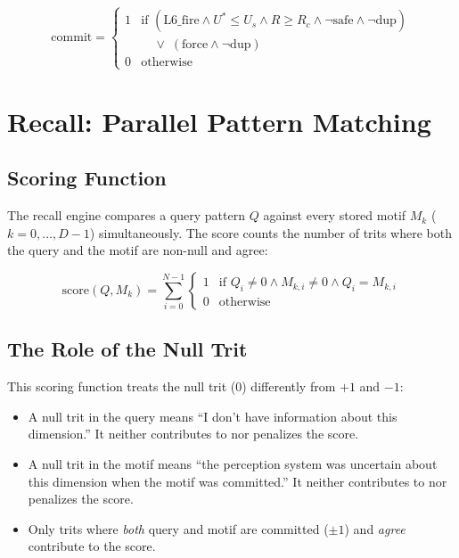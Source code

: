 \documentclass[11pt, a4paper]{article}
\begin{document}
\begin{equation}
  \text{commit} =
  \begin{cases}
    1 & \text{if } (\text{L6\_fire} \wedge U^* \leq U_s
        \wedge R \geq R_c \wedge \neg\text{safe}
        \wedge \neg\text{dup}) \\
      & \quad \vee\; (\text{force} \wedge \neg\text{dup}) \\
    0 & \text{otherwise}
  \end{cases}
\end{equation}

\section{Recall: Parallel Pattern Matching}

\subsection{Scoring Function}

The recall engine compares a query pattern $Q$ against every
stored motif $M_k$ ($k = 0, \ldots, D-1$) simultaneously.
The score counts the number of trits where both the query
and the motif are non-null and agree:

\begin{equation}
  \text{score}(Q, M_k) = \sum_{i=0}^{N-1}
  \begin{cases}
    1 & \text{if } Q_i \neq 0 \wedge M_{k,i} \neq 0
        \wedge Q_i = M_{k,i} \\
    0 & \text{otherwise}
  \end{cases}
\end{equation}

\subsection{The Role of the Null Trit}

This scoring function treats the null trit ($0$) differently
from $+1$ and $-1$:

\begin{itemize}[nosep]
  \item A null trit in the query means ``I don't have information
        about this dimension.'' It neither contributes to nor
        penalizes the score.
  \item A null trit in the motif means ``the perception system
        was uncertain about this dimension when the motif was
        committed.'' It neither contributes to nor penalizes the
        score.
  \item Only trits where \textit{both} query and motif are
        committed ($\pm 1$) and \textit{agree} contribute to
        the score.
\end{itemize}
\end{document}
